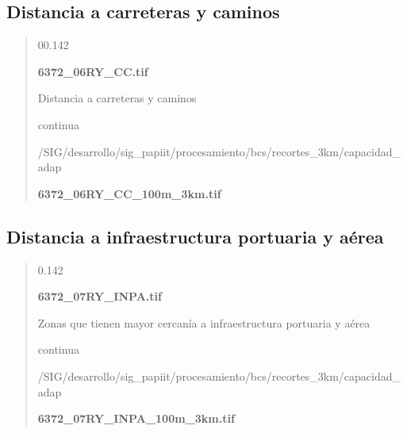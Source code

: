 \documentclass[letterpaper,10pt,spanish]{sphinxmanual}
\begin{document}
\subsection{Distancia a carreteras y caminos}
\label{\detokenize{resiliencia_bcs:distancia-a-carreteras-y-caminos}}
\begin{quote}

 00.142

 {\color{red}\bfseries{}\textbar{}6372\_06RY\_CC.tif\textbar{}}

 Distancia a carreteras y caminos

 continua


 /SIG/desarrollo/sig\_papiit/procesamiento/bcs/recortes\_3km/capacidad\_adap

  {\color{red}\bfseries{}\textbar{}6372\_06RY\_CC\_100m\_3km.tif\textbar{}}

 \textbar{}\textbar{}
\end{quote}


\subsection{Distancia a infraestructura portuaria y aérea}
\label{\detokenize{resiliencia_bcs:distancia-a-infraestructura-portuaria-y-aerea}}
\begin{quote}

 0.142

 {\color{red}\bfseries{}\textbar{}6372\_07RY\_INPA.tif\textbar{}}

 Zonas que tienen mayor cercanía a infraestructura portuaria y aérea

 continua


 /SIG/desarrollo/sig\_papiit/procesamiento/bcs/recortes\_3km/capacidad\_adap

  {\color{red}\bfseries{}\textbar{}6372\_07RY\_INPA\_100m\_3km.tif\textbar{}}

\end{quote}
\end{document}
